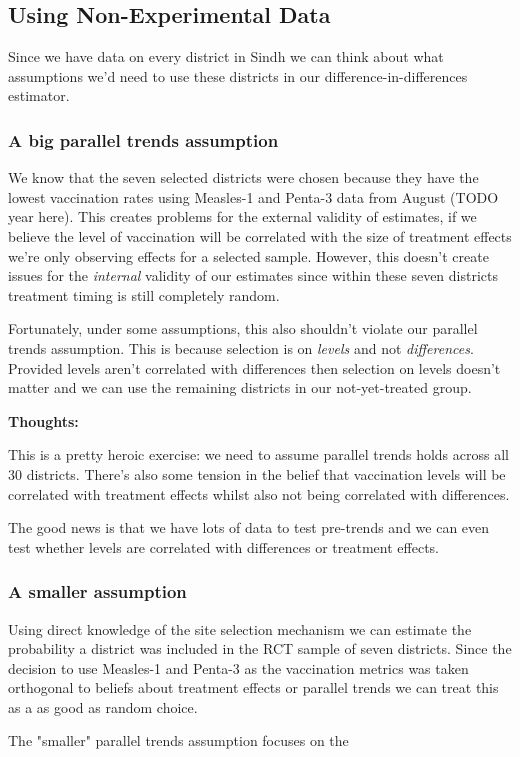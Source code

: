 \documentclass{article}
\begin{document}
   \subsection*{Using Non-Experimental Data}

   Since we have data on every district in Sindh we can think about what assumptions 
   we'd need to use these districts in our difference-in-differences estimator.

   \subsubsection*{A big parallel trends assumption}
   We know that the seven selected districts were chosen because they have the 
   lowest vaccination rates using Measles-1 and Penta-3 data from August (TODO year here). This 
   creates problems for the external validity of estimates, if we believe 
   the level of vaccination will be correlated with the size of treatment effects 
   we're only observing effects for a selected sample. However, this doesn't create 
   issues for the \textit{internal} validity of our estimates since within these 
   seven districts treatment timing is still completely random.

   Fortunately, under some assumptions, this also shouldn't violate  our 
   parallel trends assumption. This 
   is because selection is on \textit{levels} and not \textit{differences}.  
   Provided levels aren't correlated with differences then selection on levels 
   doesn't matter and we can use the remaining districts in our not-yet-treated 
   group.

   \textbf{Thoughts:}

   This is a pretty heroic exercise: we need to assume parallel trends holds across 
   all 30 districts. There's also some tension in the belief that vaccination 
   levels will be correlated with treatment effects whilst also not being correlated 
   with differences.


   The good news is that we have lots of data to test pre-trends and we can even 
   test whether levels are correlated with differences or treatment effects.

   \subsubsection*{A smaller assumption}

   Using direct knowledge of the site selection mechanism we can estimate the 
   probability a district was included in the RCT sample of seven districts. Since the 
   decision to use Measles-1 and Penta-3 as the vaccination metrics was taken 
   orthogonal to beliefs about treatment effects or parallel trends we can 
   treat this as a as good as random choice.  
   




   The "smaller" parallel trends assumption focuses on the 
\end{document}
